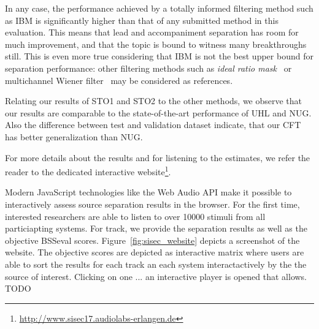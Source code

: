 In any case, the performance achieved by a totally informed filtering method such as IBM is significantly higher than that of any submitted method in this evaluation. This means that lead and accompaniment separation has room for much improvement, and that the topic is bound to witness many breakthroughs still. This is even more true considering that IBM is not the best upper bound for separation performance: other filtering methods such as \textit{ideal ratio mask}~\cite{liutkus15c} or multichannel Wiener filter~\cite{duong10} may be considered as references.
\par
Relating our results of STO1 and STO2 to the other methods, we observe that our results are comparable to the state-of-the-art performance of UHL and NUG.
Also the difference between test and validation dataset indicate, that our CFT has better generalization than NUG.

For more details about the results and for listening to the estimates, we refer the reader to the dedicated interactive website\footnote{\url{http://www.sisec17.audiolabs-erlangen.de}}.

Modern JavaScript technologies like the Web Audio API make it possible to interactively assess source separation results in the browser.
For the first time, interested researchers are able to listen to over 10000 stimuli from all particiapting systems.
For track, we provide the separation results as well as the objective BSSeval scores.
Figure~\ref{fig:sisec_website} depicts a screenshot of the website.
The objective scores are depicted as interactive matrix where users are able to sort the results for each track an each system interactactively by the the source of interest.
Clicking on one ... an interactive player is opened that allows.
TODO


